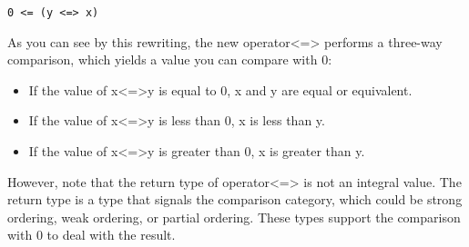 \begin{lstlisting}[style=styleCXX]
0 <= (y <=> x)
\end{lstlisting}

As you can see by this rewriting, the new operator<=> performs a three-way comparison, which yields a value you can compare with 0:

\begin{itemize}
\item
If the value of x<=>y is equal to 0, x and y are equal or equivalent.

\item
If the value of x<=>y is less than 0, x is less than y.

\item
If the value of x<=>y is greater than 0, x is greater than y.
\end{itemize}

However, note that the return type of operator<=> is not an integral value. The return type is a type that signals the comparison category, which could be strong ordering, weak ordering, or partial ordering. These types support the comparison with 0 to deal with the result.










